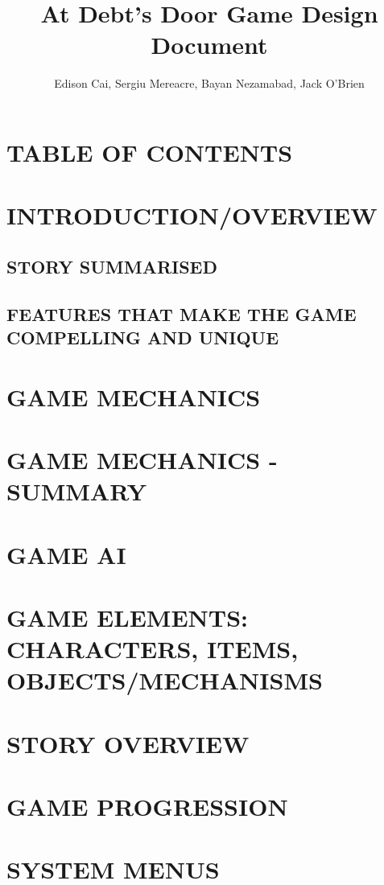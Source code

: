 \documentclass{article}
\author{Edison Cai, Sergiu Mereacre, Bayan Nezamabad, Jack O'Brien}
\title{At Debt's Door Game Design Document}
\begin{document}
\maketitle

\section{TABLE OF CONTENTS}

\section{INTRODUCTION/OVERVIEW}

\subsection{STORY SUMMARISED}

\subsection{FEATURES THAT MAKE THE GAME COMPELLING AND UNIQUE}

\section{GAME MECHANICS}

\section{GAME MECHANICS - SUMMARY}

\section{GAME AI}

\section{GAME ELEMENTS: CHARACTERS, ITEMS, OBJECTS/MECHANISMS}

\section{STORY OVERVIEW}

\section{GAME PROGRESSION}

\section{SYSTEM MENUS}
\end{document}
